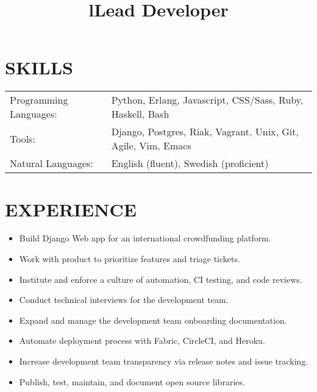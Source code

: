 \documentclass[line]{res}
\title{l}\dates{r}\\
\begin{document}
\begin{resume}

\section{SKILLS}
\begin{tabular}{ l l }
Programming Languages: &
Python,
Erlang,
Javascript,
CSS/Sass,
Ruby,
Haskell,
Bash\\

Tools: &
Django,
Postgres,
Riak,
Vagrant,
Unix,
Git,
Agile,
Vim,
Emacs \\

Natural Languages: &
English (fluent),
Swedish (proficient)
\end{tabular}

\section {EXPERIENCE}
\vspace {2 pt}

\title{Lead Developer}
\begin{position}
\noindent
\vspace {-10 pt}
\begin{itemize}

\item Build Django Web app for an international crowdfunding platform.
\item Work with product to prioritize features and triage tickets.
\item Institute and enforce a culture of automation, CI testing, and code reviews.
\item Conduct technical interviews for the development team.
\item Expand and manage the development team onboarding documentation.
\item Automate deployment process with Fabric, CircleCI, and Heroku.
\item Increase development team transparency via release notes and issue tracking.
\item Publish, test, maintain, and document open source libraries.

\end{itemize}
\end{position}



\end{resume}
\end{document}
